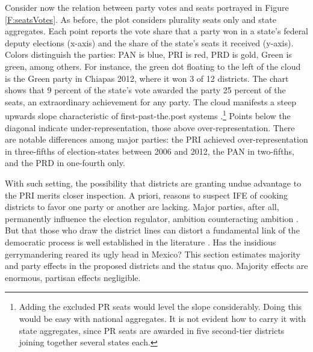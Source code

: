 \documentclass[letter,12pt]{article}
\begin{document}
Consider now the relation between party votes and seats portrayed in Figure \ref{F:seatsVotes}. As before, the plot considers plurality seats only and state aggregates. Each point reports the vote share that a party won in a state's federal deputy elections (x-axis) and the share of the state's seats it received (y-axis). Colors distinguish the parties: PAN is blue, PRI is red, PRD is gold, Green is green, among others. For instance, the green dot floating to the left of the cloud is the Green party in Chiapas 2012, where it won 3 of 12 districts. The chart shows that 9 percent of the state's vote awarded the party 25 percent of the seats, an extraordinary achievement for any party. The cloud manifests a steep upwards slope characteristic of first-past-the.post systems \citep{taagepera.CubeLaw.1973}.\footnote{Adding the excluded PR seats would level the slope considerably. Doing this would be easy with national aggregates. It is not evident how to carry it with state aggregates, since PR seats are awarded in five second-tier districts joining together several states each.} Points below the diagonal indicate under-representation, those above over-representation. There are notable differences among major parties: the PRI achieved over-representation in three-fifths of election-states between 2006 and 2012, the PAN in two-fifths, and the PRD in one-fourth only. 

With such setting, the possibility that districts are granting undue advantage to the PRI merits closer inspection. A priori, reasons to suspect IFE of cooking districts to favor one party or another are lacking. Major parties, after all, permanently influence the election regulator, ambition counteracting ambition \citep{estevez.magar.rosas.2008}. But that those who draw the district lines can distort a fundamental link of the democratic process is well established in the literature \citep{altman.mcdonald2011bard,cox.katz.2002,engstrom2006redisttrictApsr,rossiter.etal.1997,king.1990elRespBiasMultiparty,balinskiYoung2001FairRep,otero.2003}. Has the insidious gerrymandering reared its ugly head in Mexico? This section estimates majority and party effects in the proposed districts and the status quo. Majority effects are enormous, partisan effects negligible. 

\end{document}
